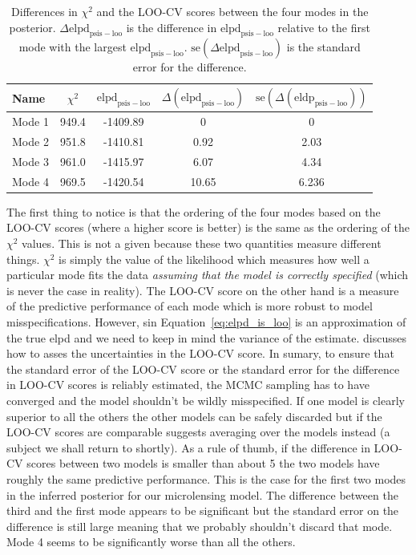 \documentclass[12pt,dvipsnames]{report}
\begin{document}
\begin{table}[h!]
\centering
\begin{tabular}{l c c c c} 
 \toprule
Name & $\chi^2$ & $\mathrm{elpd}_\mathrm{psis-loo}$ & $\Delta(\mathrm{elpd}_\mathrm{psis-loo})$ & $\mathrm{se}(\Delta(\mathrm{eldp}_\mathrm{psis-loo}))$ \\
 \midrule
 Mode 1 & 949.4& -1409.89 & 0 & 0 \\
 Mode 2 & 951.8& -1410.81 & 0.92 & 2.03\\
 Mode 3 & 961.0& -1415.97 &  6.07 & 4.34\\
 Mode 4 & 969.5& -1420.54 &  10.65	& 6.236\\
\bottomrule
\end{tabular}
\caption{Differences in $\chi^2$ and the LOO-CV scores between the four modes in the 
posterior. $\Delta \mathrm{elpd}_\mathrm{psis-loo}$ is the difference in 
$\mathrm{elpd}_\mathrm{psis-loo}$ relative to the first mode with the largest 
$\mathrm{elpd}_\mathrm{psis-loo}$. $\mathrm{se}(\Delta \mathrm{elpd}_\mathrm{psis-loo})$
is the standard error for the difference.}
\label{tab:loo_cv}
\end{table}


The first thing to notice is that the ordering of the four modes based on the LOO-CV scores 
(where a higher score is better) is the same as the ordering of the $\chi^2$ values. 
This is not a given because these two quantities measure different things. 
$\chi^2$ is simply the value of the likelihood
which measures how well a particular mode fits the data \emph{assuming that the model is 
correctly specified} (which is never the case in reality).
The LOO-CV score on the other hand is a measure of the predictive performance of each 
mode which is more robust to model misspecifications. However, 
sin Equation~\ref{eq:elpd_is_loo} is an approximation of the true elpd and we need to 
keep in mind the variance of the estimate. 
\citet{arXiv:2008.10296} discusses how 
to asses the uncertainties in the LOO-CV score. In sumary, to ensure that the standard 
error of the LOO-CV score or the standard error for the difference in LOO-CV scores is 
reliably estimated, the MCMC sampling has to have converged and the model shouldn't 
be wildly misspecified. If one model is clearly superior to all the others 
the other models can be safely discarded but if the LOO-CV scores are comparable 
\citet{arXiv:2008.10296} suggests averaging over the models instead (a subject we 
shall return to shortly).
As a rule of thumb, if the difference in LOO-CV scores between two models is smaller 
than about 5 the two models have roughly the same predictive performance.
This is the case for the first two modes in the inferred posterior for our microlensing 
model. The difference between the third 
and the first mode appears to be significant but the standard error on the difference 
is still large meaning that we probably shouldn't discard that mode.
Mode 4 seems to be significantly worse than all the others.
\end{document}

